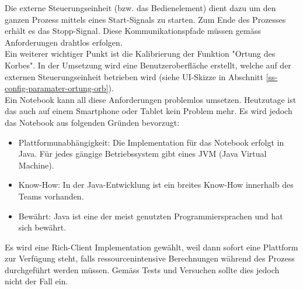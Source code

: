 Die externe Steuerungseinheit (bzw. das Bedienelement) dient dazu um den ganzen Prozess mittels eines Start-Signals zu starten. Zum Ende des Prozesses erhält es das Stopp-Signal. Diese Kommunikationspfade müssen gemäss Anforderungen drahtlos erfolgen. \\
Ein weiterer wichtiger Punkt ist die Kalibrierung der Funktion "Ortung des Korbes". In der Umsetzung wird eine Benutzeroberfläche erstellt, welche auf der externen Steuerungseinheit betrieben wird (siehe UI-Skizze in Abschnitt \ref{ss-config-paramater-ortung-orb}).\\
Ein Notebook kann all diese Anforderungen problemlos umsetzen. Heutzutage ist das auch auf einem Smartphone oder Tablet kein Problem mehr. Es wird jedoch das Notebook aus folgenden Gründen bevorzugt:

\begin{itemize}
	\item Plattformunabhängigkeit: Die Implementation für das Notebook erfolgt in Java. Für jedes gängige Betriebssystem gibt eines JVM (Java Virtual Machine).
	\item Know-How: In der Java-Entwicklung ist ein breites Know-How innerhalb des Teams vorhanden.
	\item Bewährt: Java ist eine der meist genutzten Programmiersprachen und hat sich bewährt.
\end{itemize}

Es wird eine Rich-Client Implementation gewählt, weil dann sofort eine Plattform zur Verfügung steht, falls ressourcenintensive Berechnungen während des Prozess durchgeführt werden müssen. Gemäss Tests und Versuchen sollte dies jedoch nicht der Fall ein.



